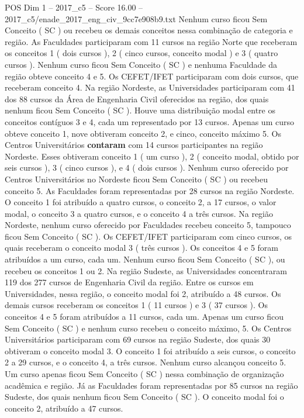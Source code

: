 \begin{textsample}{POS Dim 1 – 2017\_c5 – Score 16.00 – 2017\_c5/enade\_2017\_eng\_civ\_9cc7e908b9.txt}
Nenhum curso ficou Sem Conceito ( SC ) ou recebeu os demais conceitos nessa combinação de categoria e região.
As Faculdades participaram com 11 cursos na região Norte que receberam os conceitos 1 ( dois cursos ), 2 ( cinco cursos, conceito modal ) e 3 ( quatro cursos ).
Nenhum curso ficou Sem Conceito ( SC ) e nenhuma Faculdade da região obteve conceito 4 e 5.
Os CEFET/IFET participaram com dois cursos, que receberam conceito 4.
Na região Nordeste, as Universidades participaram com 41 dos 88 cursos da Área de Engenharia Civil oferecidos na região, dos quais nenhum ficou Sem Conceito ( SC ).
Houve uma distribuição modal entre os conceitos contíguos 3 e 4, cada um representado por 13 cursos.
Apenas um curso obteve conceito 1, nove obtiveram conceito 2, e cinco, conceito máximo 5.
Os Centros Universitários \textbf{contaram} com 14 cursos participantes na região Nordeste.
Esses obtiveram conceito 1 ( um curso ), 2 ( conceito modal, obtido por seis cursos ), 3 ( cinco cursos ), e 4 ( dois cursos ).
Nenhum curso oferecido por Centros Universitários no Nordeste ficou Sem Conceito ( SC ) ou recebeu conceito 5.
As Faculdades foram representadas por 28 cursos na região Nordeste.
O conceito 1 foi atribuído a quatro cursos, o conceito 2, a 17 cursos, o valor modal, o conceito 3 a quatro cursos, e o conceito 4 a três cursos.
Na região Nordeste, nenhum curso oferecido por Faculdades recebeu conceito 5, tampouco ficou Sem Conceito ( SC ).
Os CEFET/IFET participaram com cinco cursos, os quais receberam o conceito modal 3 ( três cursos ).
Os conceitos 4 e 5 foram atribuídos a um curso, cada um.
Nenhum curso ficou Sem Conceito ( SC ), ou recebeu os conceitos 1 ou 2.
Na região Sudeste, as Universidades concentraram 119 dos 277 cursos de Engenharia Civil da região.
Entre os cursos em Universidades, nessa região, o conceito modal foi 2, atribuído a 48 cursos.
Os demais cursos receberam os conceitos 1 ( 11 cursos ) e 3 ( 37 cursos ).
Os conceitos 4 e 5 foram atribuídos a 11 cursos, cada um.
Apenas um curso ficou Sem Conceito ( SC ) e nenhum curso recebeu o conceito máximo, 5.
Os Centros Universitários participaram com 69 cursos na região Sudeste, dos quais 30 obtiveram o conceito modal 3.
O conceito 1 foi atribuído a seis cursos, o conceito 2 a 29 cursos, e o conceito 4, a três cursos.
Nenhum curso alcançou conceito 5.
Um curso apenas ficou Sem Conceito ( SC ) nessa combinação de organização acadêmica e região.
Já as Faculdades foram representadas por 85 cursos na região Sudeste, dos quais nenhum ficou Sem Conceito ( SC ).
O conceito modal foi o conceito 2, atribuído a 47 cursos.

\end{textsample}
